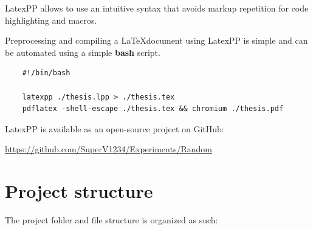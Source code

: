 \documentclass[12pt]{report}
\renewcommand\emph{\textbf}
\begin{document}
                    LatexPP allows to use an intuitive syntax that avoids markup repetition for code highlighting and macros.

                    Preprocessing and compiling a \LaTeX document using LatexPP is simple and can be automated using a simple \emph{bash} script.

\begin{verbatim}
    #!/bin/bash

    latexpp ./thesis.lpp > ./thesis.tex
    pdflatex -shell-escape ./thesis.tex && chromium ./thesis.pdf
\end{verbatim}

                    LatexPP is available as an open-source project on GitHub:

                    \url{https://github.com/SuperV1234/Experiments/Random}


        \chapter{Project structure}
            The project folder and file structure is organized as such:
\end{document}
